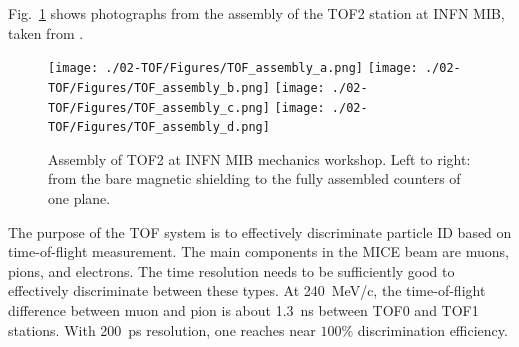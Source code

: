 Fig.~\ref{fig:TOF2} shows photographs from the assembly of the TOF2
station at INFN MIB, taken from \cite{NOTE286}.
\begin{figure}
  \begin{center}
  \texttt{[image: ./02-TOF/Figures/TOF\_assembly\_a.png]}
  \texttt{[image: ./02-TOF/Figures/TOF\_assembly\_b.png]}
  \texttt{[image: ./02-TOF/Figures/TOF\_assembly\_c.png]}
  \texttt{[image: ./02-TOF/Figures/TOF\_assembly\_d.png]}
  \caption{Assembly of TOF2 at INFN MIB mechanics workshop. Left to
    right: from the bare magnetic shielding to the fully assembled
    counters of one plane.}
  \label{fig:TOF2}
  \end{center}
\end{figure}






The purpose of the TOF system is to effectively discriminate particle
ID based on time-of-flight measurement. The main components in the
MICE beam are muons, pions, and electrons. The time resolution needs
to be sufficiently good to effectively discriminate between these
types. At 240~MeV/c, the time-of-flight difference between muon and
pion is about 1.3~ns between TOF0 and TOF1 stations. With 200~ps
resolution, one reaches near $100\%$ discrimination efficiency.

